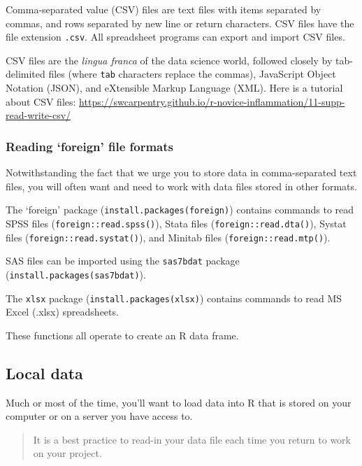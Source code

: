 \documentclass[]{article}
\begin{document}
Comma-separated value (CSV) files are text files with items separated by
commas, and rows separated by new line or return characters. CSV files
have the file extension \texttt{.csv}. All spreadsheet programs can
export and import CSV files.

CSV files are the \emph{lingua franca} of the data science world,
followed closely by tab-delimited files (where \texttt{tab} characters
replace the commas), JavaScript Object Notation (JSON), and eXtensible
Markup Language (XML). Here is a tutorial about CSV files:
\url{https://swcarpentry.github.io/r-novice-inflammation/11-supp-read-write-csv/}

\subsubsection{\texorpdfstring{Reading `foreign' file
formats}{Reading foreign file formats}}\label{reading-foreign-file-formats}

Notwithstanding the fact that we urge you to store data in
comma-separated text files, you will often want and need to work with
data files stored in other formats.

The `foreign' package
(\texttt{install.packages(\textquotesingle{}foreign\textquotesingle{})})
contains commands to read SPSS files (\texttt{foreign::read.spss()}),
Stata files (\texttt{foreign::read.dta()}), Systat files
(\texttt{foreign::read.systat()}), and Minitab files
(\texttt{foreign::read.mtp()}).

SAS files can be imported using the \texttt{sas7bdat} package
(\texttt{install.packages(\textquotesingle{}sas7bdat\textquotesingle{})}).

The \texttt{xlsx} package
(\texttt{install.packages(\textquotesingle{}xlsx\textquotesingle{})})
contains commands to read MS Excel (.xlsx) spreadsheets.

These functions all operate to create an R data frame.

\subsection{Local data}\label{local-data}

Much or most of the time, you'll want to load data into R that is stored
on your computer or on a server you have access to.

\begin{quote}
It is a best practice to read-in your data file each time you return to
work on your project.
\end{quote}
\end{document}
